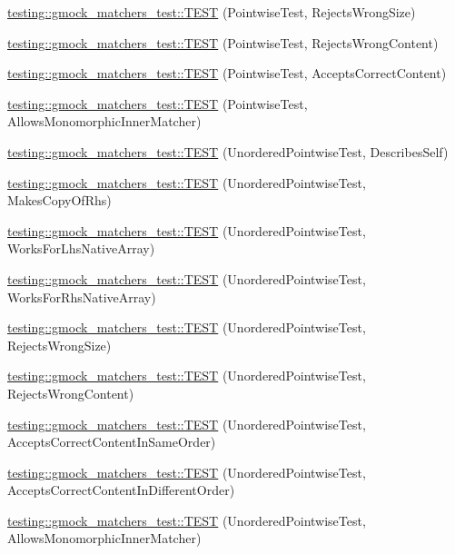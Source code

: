 \begin{DoxyCompactItemize}
\item 
\hyperlink{namespacetesting_1_1gmock__matchers__test_a1f73a8fa9dd9560bd606a990444a81fe}{testing\+::gmock\+\_\+matchers\+\_\+test\+::\+T\+E\+ST} (Pointwise\+Test, Rejects\+Wrong\+Size)
\item 
\hyperlink{namespacetesting_1_1gmock__matchers__test_a135ad7162da91c9a234193fbbe5ef775}{testing\+::gmock\+\_\+matchers\+\_\+test\+::\+T\+E\+ST} (Pointwise\+Test, Rejects\+Wrong\+Content)
\item 
\hyperlink{namespacetesting_1_1gmock__matchers__test_a42b98b370f1897cecfafbbfba53f4f38}{testing\+::gmock\+\_\+matchers\+\_\+test\+::\+T\+E\+ST} (Pointwise\+Test, Accepts\+Correct\+Content)
\item 
\hyperlink{namespacetesting_1_1gmock__matchers__test_a9bbef6d651166c37af32c54923bcd849}{testing\+::gmock\+\_\+matchers\+\_\+test\+::\+T\+E\+ST} (Pointwise\+Test, Allows\+Monomorphic\+Inner\+Matcher)
\item 
\hyperlink{namespacetesting_1_1gmock__matchers__test_af3307f88a321331155a146d49974e3e3}{testing\+::gmock\+\_\+matchers\+\_\+test\+::\+T\+E\+ST} (Unordered\+Pointwise\+Test, Describes\+Self)
\item 
\hyperlink{namespacetesting_1_1gmock__matchers__test_a05e9bbee9d19692f45a846c2ff45e016}{testing\+::gmock\+\_\+matchers\+\_\+test\+::\+T\+E\+ST} (Unordered\+Pointwise\+Test, Makes\+Copy\+Of\+Rhs)
\item 
\hyperlink{namespacetesting_1_1gmock__matchers__test_a57e330a5ae600f65d4daa2ed57bbc887}{testing\+::gmock\+\_\+matchers\+\_\+test\+::\+T\+E\+ST} (Unordered\+Pointwise\+Test, Works\+For\+Lhs\+Native\+Array)
\item 
\hyperlink{namespacetesting_1_1gmock__matchers__test_ae75a933b86db4c43a7bec2ffa97692ef}{testing\+::gmock\+\_\+matchers\+\_\+test\+::\+T\+E\+ST} (Unordered\+Pointwise\+Test, Works\+For\+Rhs\+Native\+Array)
\item 
\hyperlink{namespacetesting_1_1gmock__matchers__test_a50412d02c70f8303a087e6832d26ba62}{testing\+::gmock\+\_\+matchers\+\_\+test\+::\+T\+E\+ST} (Unordered\+Pointwise\+Test, Rejects\+Wrong\+Size)
\item 
\hyperlink{namespacetesting_1_1gmock__matchers__test_a9a9a85c6598ab74463703acbd01aa1a7}{testing\+::gmock\+\_\+matchers\+\_\+test\+::\+T\+E\+ST} (Unordered\+Pointwise\+Test, Rejects\+Wrong\+Content)
\item 
\hyperlink{namespacetesting_1_1gmock__matchers__test_aa68bf48e4a8fa41fcd60f59cc60ede8f}{testing\+::gmock\+\_\+matchers\+\_\+test\+::\+T\+E\+ST} (Unordered\+Pointwise\+Test, Accepts\+Correct\+Content\+In\+Same\+Order)
\item 
\hyperlink{namespacetesting_1_1gmock__matchers__test_a3d48732b4a6069cfcf5c0dde6027dad5}{testing\+::gmock\+\_\+matchers\+\_\+test\+::\+T\+E\+ST} (Unordered\+Pointwise\+Test, Accepts\+Correct\+Content\+In\+Different\+Order)
\item 
\hyperlink{namespacetesting_1_1gmock__matchers__test_af16d28a9f3a07b8ef2962b868b4f8399}{testing\+::gmock\+\_\+matchers\+\_\+test\+::\+T\+E\+ST} (Unordered\+Pointwise\+Test, Allows\+Monomorphic\+Inner\+Matcher)
\end{DoxyCompactItemize}
